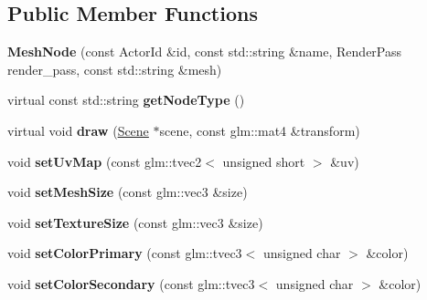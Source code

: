 \subsection*{Public Member Functions}
\begin{DoxyCompactItemize}
\item 
\mbox{\label{classTarbora_1_1MeshNode_a0efb0e3c02ed8171d4e8fd8767db56d5}} 
{\bfseries Mesh\+Node} (const Actor\+Id \&id, const std\+::string \&name, Render\+Pass render\+\_\+pass, const std\+::string \&mesh)
\item 
\mbox{\label{classTarbora_1_1MeshNode_a9d08270219e7fcf60bb5cb60dcfd37bc}} 
virtual const std\+::string {\bfseries get\+Node\+Type} ()
\item 
\mbox{\label{classTarbora_1_1MeshNode_a75eb4c26b4462296708f304ad98f99cd}} 
virtual void {\bfseries draw} (\hyperlink{classTarbora_1_1Scene}{Scene} $\ast$scene, const glm\+::mat4 \&transform)
\item 
\mbox{\label{classTarbora_1_1MeshNode_a3c8bd7580be12704276915ce38da68e9}} 
void {\bfseries set\+Uv\+Map} (const glm\+::tvec2$<$ unsigned short $>$ \&uv)
\item 
\mbox{\label{classTarbora_1_1MeshNode_afaaf9bb00ddf7e2c5a42d1daee15b91f}} 
void {\bfseries set\+Mesh\+Size} (const glm\+::vec3 \&size)
\item 
\mbox{\label{classTarbora_1_1MeshNode_aeb45fbaa931407921cacc80678e1dde6}} 
void {\bfseries set\+Texture\+Size} (const glm\+::vec3 \&size)
\item 
\mbox{\label{classTarbora_1_1MeshNode_af2af710ccd6aa8f1147246964d4e7dee}} 
void {\bfseries set\+Color\+Primary} (const glm\+::tvec3$<$ unsigned char $>$ \&color)
\item 
\mbox{\label{classTarbora_1_1MeshNode_a590258c4e7f24617d3edc9a678cfa08b}} 
void {\bfseries set\+Color\+Secondary} (const glm\+::tvec3$<$ unsigned char $>$ \&color)
\item 
\mbox{\label{classTarbora_1_1MeshNode_a196021be1a2decf451511227ad059b1b}} 

\end{DoxyCompactItemize}

